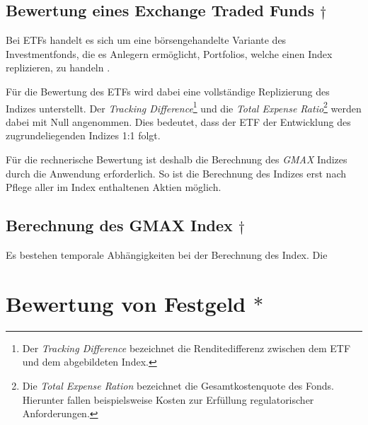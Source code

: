 \documentclass[12pt, a4paper]{article}
\begin{document}

\subsection{Bewertung eines Exchange Traded Funds $\dagger$}
\label{sec:bewertung_eines_exchange_traded_funds}
Bei \glspl{ETF} handelt es sich um eine börsengehandelte Variante des Investmentfonds, die es Anlegern ermöglicht, Portfolios, welche einen Index replizieren, zu handeln \autocite[][S.~103]{bodie_investments_2018}. 

Für die Bewertung des \glspl{ETF} wird dabei eine vollständige Replizierung des Indizes unterstellt.
Der \textit{Tracking Difference}\footnote{Der \textit{Tracking Difference} bezeichnet die Renditedifferenz zwischen dem \gls{ETF} und dem abgebildeten Index.} und die \textit{Total Expense Ratio}\footnote{Die \textit{Total Expense Ration} bezeichnet die Gesamtkostenquote des Fonds. Hierunter fallen beispielsweise Kosten zur Erfüllung regulatorischer Anforderungen.} werden dabei mit Null angenommen.
Dies bedeutet, dass der \gls{ETF} der Entwicklung des zugrundeliegenden Indizes 1:1 folgt.


Für die rechnerische Bewertung ist deshalb die Berechnung des \textit{GMAX} Indizes durch die Anwendung erforderlich. So ist die Berechnung des Indizes erst nach Pflege aller im Index enthaltenen Aktien möglich.

\subsection{Berechnung des {GMAX} Index $\dagger$}

Es bestehen temporale Abhängigkeiten bei der Berechnung des Index. Die 



\section{Bewertung von Festgeld $\ast$}
\label{sec:bewertung_von_festgeldern}
\end{document}
